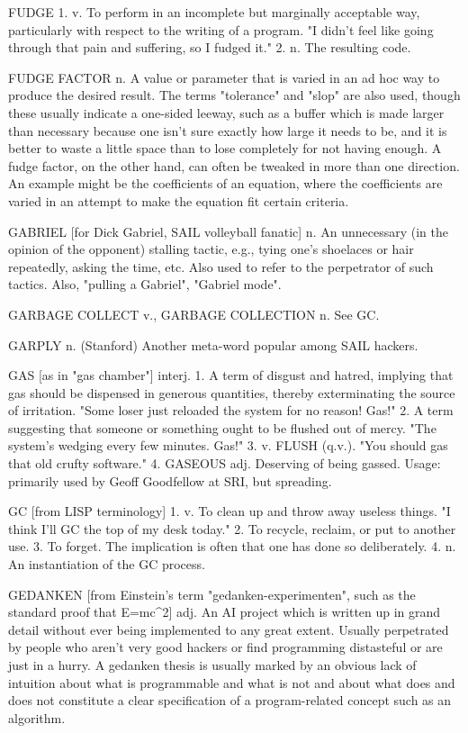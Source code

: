 FUDGE 1. v. To perform in an incomplete but marginally acceptable way,
   particularly with respect to the writing of a program.  "I didn't
   feel like going through that pain and suffering, so I fudged it."
   2. n. The resulting code.

FUDGE FACTOR n. A value or parameter that is varied in an ad hoc way
   to produce the desired result.  The terms "tolerance" and "slop"
   are also used, though these usually indicate a one-sided leeway,
   such as a buffer which is made larger than necessary because one
   isn't sure exactly how large it needs to be, and it is better to
   waste a little space than to lose completely for not having enough.
   A fudge factor, on the other hand, can often be tweaked in more
   than one direction.	An example might be the coefficients of an
   equation, where the coefficients are varied in an attempt to make
   the equation fit certain criteria.

GABRIEL [for Dick Gabriel, SAIL volleyball fanatic] n. An unnecessary
   (in the opinion of the opponent) stalling tactic, e.g., tying one's
   shoelaces or hair repeatedly, asking the time, etc.	Also used to
   refer to the perpetrator of such tactics.  Also, "pulling a
   Gabriel", "Gabriel mode".

GARBAGE COLLECT v., GARBAGE COLLECTION n. See GC.

GARPLY n. (Stanford) Another meta-word popular among SAIL hackers.

GAS [as in "gas chamber"] interj. 1. A term of disgust and hatred,
   implying that gas should be dispensed in generous quantities,
   thereby exterminating the source of irritation.  "Some loser just
   reloaded the system for no reason!  Gas!"  2. A term suggesting
   that someone or something ought to be flushed out of mercy.	"The
   system's wedging every few minutes.	Gas!"  3. v. FLUSH (q.v.).
   "You should gas that old crufty software."  4. GASEOUS adj.
   Deserving of being gassed.  Usage: primarily used by Geoff
   Goodfellow at SRI, but spreading.

GC [from LISP terminology] 1. v. To clean up and throw away useless
   things.  "I think I'll GC the top of my desk today."	 2. To
   recycle, reclaim, or put to another use.  3. To forget.  The
   implication is often that one has done so deliberately.  4. n. An
   instantiation of the GC process.

GEDANKEN [from Einstein's term "gedanken-experimenten", such as the
   standard proof that E=mc^2] adj. An AI project which is written up
   in grand detail without ever being implemented to any great extent.
   Usually perpetrated by people who aren't very good hackers or find
   programming distasteful or are just in a hurry.  A gedanken thesis
   is usually marked by an obvious lack of intuition about what is
   programmable and what is not and about what does and does not
   constitute a clear specification of a program-related concept such
   as an algorithm.

